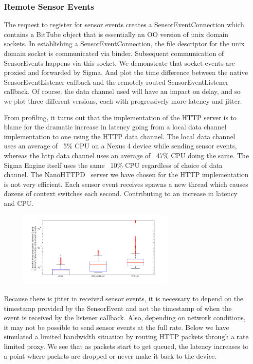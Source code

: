 \documentclass[prodmode]{acmlarge}
\begin{document}
\subsubsection{Remote Sensor Events}
The request to register for sensor events creates a SensorEventConnection which contains a BitTube object that is essentially an OO version of unix domain sockets. In establishing a SensorEventConnection, the file descriptor for the unix domain socket is communicated via binder. Subsequent communication of SensorEvents happens via this socket. We demonstrate that socket events are proxied and forwarded by Sigma. And plot the time difference between the native SensorEventListener callback and the remotely-routed SensorEventListener callback. Of course, the data channel used will have an impact on delay, and so we plot three different versions, each with progressively more latency and jitter.

From profiling, it turns out that the implementation of the HTTP server is to blame for the dramatic increase in latency going from a local data channel implementation to one using the HTTP data channel. The local data channel uses an average of ~5\% CPU on a Nexus 4 device while sending sensor events, whereas the http data channel uses an average of ~47\% CPU doing the same. The Sigma Engine itself uses the same ~10\% CPU regardless of choice of data channel. The NanoHTTPD~\cite{NanoHttpd} server we have chosen for the HTTP implementation is not very efficient. Each sensor event receives spawns a new thread which causes dozens of context switches each second. Contributing to an increase in latency and CPU.

\begin{figure}[h]
\centering
\includegraphics[width=0.7\textwidth]{plots/sensorevent_delay.png}
\end{figure}

Because there is jitter in received sensor events, it is necessary to depend on the timestamp provided by the SensorEvent and not the timestamp of when the event is received by the listener callback. Also, depending on network conditions, it may not be possible to send sensor events at the full rate. Below we have simulated a limited bandwidth situation by routing HTTP packets through a rate limited proxy. We see that as packets start to get queued, the latency increases to a point where packets are dropped or never make it back to the device.
\end{document}
